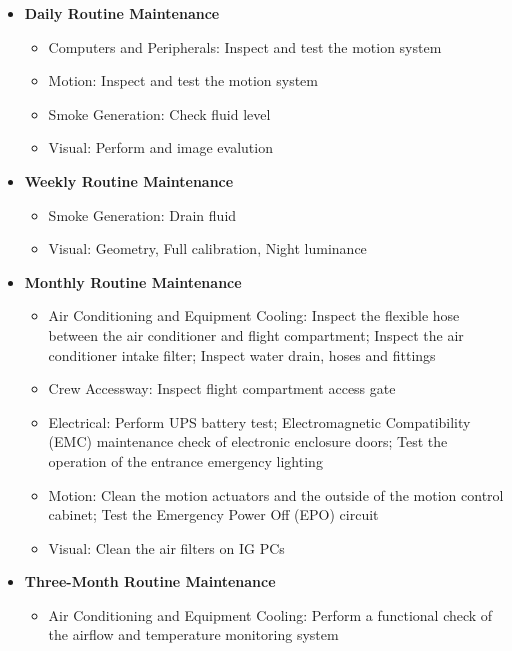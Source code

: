         \begin{itemize}
            \item \textbf{Daily Routine Maintenance}
            \begin{itemize}
                \item Computers and Peripherals: Inspect and test the motion system
                \item Motion: Inspect and test the motion system
                \item Smoke Generation: Check fluid level
                \item Visual: Perform and image evalution
            \end{itemize}
            \item \textbf{Weekly Routine Maintenance}
            \begin{itemize}
                \item Smoke Generation: Drain fluid 
                \item Visual: Geometry, Full calibration, Night luminance
            \end{itemize}
            \item \textbf{Monthly Routine Maintenance}
            \begin{itemize}
                \item Air Conditioning and Equipment Cooling: Inspect the flexible hose between the air conditioner and flight compartment; 
                Inspect the air conditioner intake filter; Inspect water drain, hoses and fittings
                \item Crew Accessway: Inspect flight compartment access gate
                \item Electrical: Perform UPS battery test; Electromagnetic Compatibility (EMC) maintenance check of electronic enclosure doors; 
                Test the operation of the entrance emergency lighting
                \item Motion: Clean the motion actuators and the outside of the motion control cabinet; Test the Emergency Power Off (EPO) circuit
                \item Visual: Clean the air filters on IG PCs
            \end{itemize}
            \item \textbf{Three-Month Routine Maintenance}
            \begin{itemize}
                \item Air Conditioning and Equipment Cooling: Perform a functional check of the airflow and temperature monitoring system

\end{itemize}
\end{itemize}
